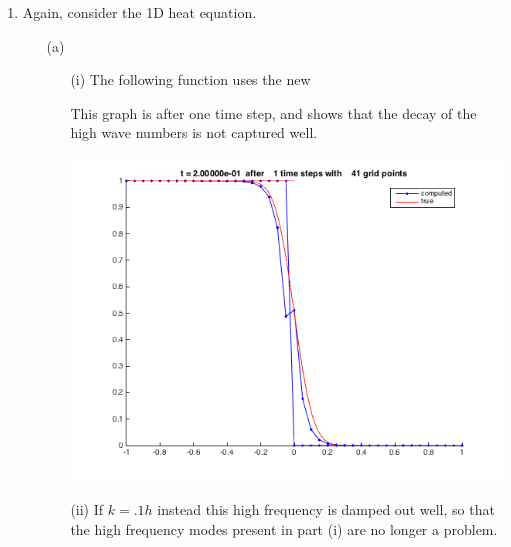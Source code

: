 \documentclass[11pt, oneside, titlepage]{article}
\begin{document}
\begin{enumerate}
    \item %
        Again, consider the 1D heat equation.
        \begin{enumerate}
            \item[(a)] %
                \begin{enumerate}
                    \item[(i)]
                        The following function uses the new 
                        
                        This graph is after one time step, and shows that the
                        decay of the high wave numbers is not captured well.
                        \begin{center}
                            \includegraphics[scale=.7]{Figures/06_3_1.png}
                        \end{center}

                    \item[(ii)]
                        If $k = .1 h$ instead this high frequency is damped out
                        well, so that the high frequency modes present in part
                        (i) are no longer a problem.


\end{enumerate}
\end{enumerate}
\end{enumerate}
\end{document}
